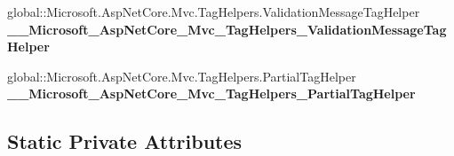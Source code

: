 \begin{DoxyCompactItemize}
global\+::\+Microsoft.\+Asp\+Net\+Core.\+Mvc.\+Tag\+Helpers.\+Validation\+Message\+Tag\+Helper {\bfseries \+\_\+\+\_\+\+Microsoft\+\_\+\+Asp\+Net\+Core\+\_\+\+Mvc\+\_\+\+Tag\+Helpers\+\_\+\+Validation\+Message\+Tag\+Helper}
\item 
\mbox{\label{class_projeto_e_s_w_1_1_areas_1_1_identity_1_1_pages_1_1_account_1_1_areas___identity___pages___account___register_a23720758c5674d7f1192b3fc3e873732}} 
global\+::\+Microsoft.\+Asp\+Net\+Core.\+Mvc.\+Tag\+Helpers.\+Partial\+Tag\+Helper {\bfseries \+\_\+\+\_\+\+Microsoft\+\_\+\+Asp\+Net\+Core\+\_\+\+Mvc\+\_\+\+Tag\+Helpers\+\_\+\+Partial\+Tag\+Helper}
\end{DoxyCompactItemize}
\subsection*{Static Private Attributes}
